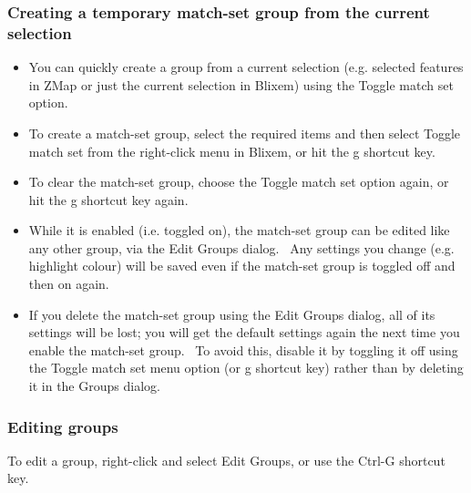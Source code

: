 \documentclass[letterpaper]{article}
\newcommand\liststyleWWviiiNumxvi{%
\renewcommand\labelitemi{{\textbullet}}
\renewcommand\labelitemii{o}
\renewcommand\labelitemiii{[F0A7?]}
\renewcommand\labelitemiv{[F0B7?]}
}
\begin{document}
{\color[rgb]{0.30980393,0.5058824,0.7411765}\subsubsection[Creating a temporary
{\textquotesingle}match{}-set{\textquotesingle} group from the current
selection]{Creating a temporary
{\textquotesingle}match-set{\textquotesingle} group from the current
selection}}
\hypertarget{RefHeading2121056909880}{}\liststyleWWviiiNumxvi
\begin{itemize}
\item {
You can quickly create a group from a current selection (e.g. selected
features in ZMap or just the current selection in Blixem) using the
{\textquotesingle}Toggle match set{\textquotesingle} option.}
\item {
To create a match-set group, select the required items and then select
{\textquotesingle}Toggle match set{\textquotesingle} from the
right-click menu in Blixem, or hit the
{\textquotesingle}g{\textquotesingle} shortcut key.}
\item {
To clear the match-set group, choose the {\textquotesingle}Toggle match
set{\textquotesingle} option again, or hit the
{\textquotesingle}g{\textquotesingle} shortcut key again.}
\item {
While it is enabled (i.e. toggled on), the match-set group can be edited
like any other group, via the {\textquotesingle}Edit
Groups{\textquotesingle} dialog. \ Any settings you change (e.g.
highlight colour) will be saved even if the match-set group is toggled
off and then on again.}
\item {
If you delete the match-set group using the {\textquotesingle}Edit
Groups{\textquotesingle} dialog, all of its settings will be lost; you
will get the default settings again the next time you enable the
match-set group. \ To avoid this, disable it by toggling it off using
the {\textquotesingle}Toggle match set{\textquotesingle} menu option
(or {\textquotesingle}g{\textquotesingle} shortcut key) rather than by
deleting it in the Groups dialog.}
\end{itemize}

{\color[rgb]{0.30980393,0.5058824,0.7411765}\subsubsection[Editing groups]{Editing groups}}
\hypertarget{RefHeading2141056909880}{}{
To edit a group, right-click and select {\textquotesingle}Edit
Groups{\textquotesingle}, or use the Ctrl-G shortcut key.}
\end{document}
